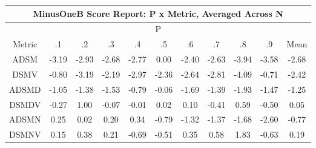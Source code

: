 \begin{longtable}{ | c || c | c | c | c | c | c | c | c | c || c |}
\hline
\multicolumn{11}{|c|}{ MinusOneB Score Report: P x Metric, Averaged Across N } \\
\hline
\multicolumn{11}{|c|}{ P } \\
\hline
Metric & .1 & .2 & .3 & .4 & .5 & .6 & .7 & .8 & .9 & Mean\\
\hline
\hline
\endhead
ADSM &  \cellcolor[HTML]{FFAFAF} -3.19 &  \cellcolor[HTML]{FFB7B7} -2.93 &  \cellcolor[HTML]{FFBFBF} -2.68 &  \cellcolor[HTML]{FFB7B7} -2.77 &  \cellcolor[HTML]{FFFFFF} 0.00 &  \cellcolor[HTML]{FFBFBF} -2.40 &  \cellcolor[HTML]{FFBFBF} -2.63 &  \cellcolor[HTML]{FF9F9F} -3.94 &  \cellcolor[HTML]{FFA7A7} -3.58 &  \cellcolor[HTML]{FFBFBF} -2.68 \\
DSMV &  \cellcolor[HTML]{FFE7E7} -0.80 &  \cellcolor[HTML]{FFAFAF} -3.19 &  \cellcolor[HTML]{FFC7C7} -2.19 &  \cellcolor[HTML]{FFB7B7} -2.97 &  \cellcolor[HTML]{FFC7C7} -2.36 &  \cellcolor[HTML]{FFBFBF} -2.64 &  \cellcolor[HTML]{FFB7B7} -2.81 &  \cellcolor[HTML]{FF9797} -4.09 &  \cellcolor[HTML]{FFEFEF} -0.71 &  \cellcolor[HTML]{FFBFBF} -2.42 \\
ADSMD &  \cellcolor[HTML]{FFE7E7} -1.05 &  \cellcolor[HTML]{FFDFDF} -1.38 &  \cellcolor[HTML]{FFD7D7} -1.53 &  \cellcolor[HTML]{FFE7E7} -0.79 &  \cellcolor[HTML]{FFFFFF} -0.06 &  \cellcolor[HTML]{FFD7D7} -1.69 &  \cellcolor[HTML]{FFDFDF} -1.39 &  \cellcolor[HTML]{FFCFCF} -1.93 &  \cellcolor[HTML]{FFD7D7} -1.47 &  \cellcolor[HTML]{FFDFDF} -1.25 \\
DSMDV &  \cellcolor[HTML]{FFF7F7} -0.27 &  \cellcolor[HTML]{E7E7FF} 1.00 &  \cellcolor[HTML]{FFFFFF} -0.07 &  \cellcolor[HTML]{FFFFFF} -0.01 &  \cellcolor[HTML]{FFFFFF} 0.02 &  \cellcolor[HTML]{FFFFFF} 0.10 &  \cellcolor[HTML]{FFF7F7} -0.41 &  \cellcolor[HTML]{EFEFFF} 0.59 &  \cellcolor[HTML]{FFEFEF} -0.50 &  \cellcolor[HTML]{FFFFFF} 0.05 \\
ADSMN &  \cellcolor[HTML]{F7F7FF} 0.25 &  \cellcolor[HTML]{FFFFFF} 0.02 &  \cellcolor[HTML]{F7F7FF} 0.20 &  \cellcolor[HTML]{F7F7FF} 0.34 &  \cellcolor[HTML]{FFEFEF} -0.79 &  \cellcolor[HTML]{FFDFDF} -1.32 &  \cellcolor[HTML]{FFDFDF} -1.37 &  \cellcolor[HTML]{FFD7D7} -1.68 &  \cellcolor[HTML]{FFBFBF} -2.60 &  \cellcolor[HTML]{FFEFEF} -0.77 \\
DSMNV &  \cellcolor[HTML]{FFFFFF} 0.15 &  \cellcolor[HTML]{F7F7FF} 0.38 &  \cellcolor[HTML]{F7F7FF} 0.21 &  \cellcolor[HTML]{FFEFEF} -0.69 &  \cellcolor[HTML]{FFEFEF} -0.51 &  \cellcolor[HTML]{F7F7FF} 0.35 &  \cellcolor[HTML]{EFEFFF} 0.58 &  \cellcolor[HTML]{CFCFFF} 1.83 &  \cellcolor[HTML]{FFEFEF} -0.63 &  \cellcolor[HTML]{F7F7FF} 0.19 \\

\end{longtable}
